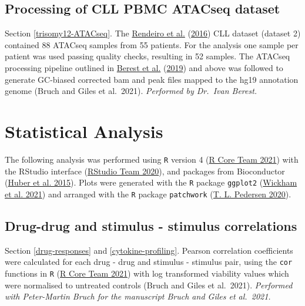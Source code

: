 \documentclass[11pt, a4paper, twosided]{book}
\begin{document}
\hypertarget{processing-of-cll-pbmc-atacseq-dataset}{%
\subsection{Processing of CLL PBMC ATACseq dataset}\label{processing-of-cll-pbmc-atacseq-dataset}}

Section \ref{trisomy12-ATACseq}. The \protect\hyperlink{ref-Rendeiro2016}{Rendeiro et al.} (\protect\hyperlink{ref-Rendeiro2016}{2016}) CLL dataset (dataset 2) contained 88 ATACseq samples from 55 patients. For the analysis one sample per patient was used passing quality checks, resulting in 52 samples. The ATACseq processing pipeline outlined in \protect\hyperlink{ref-Berest2019}{Berest et al.} (\protect\hyperlink{ref-Berest2019}{2019}) and above was followed to generate GC-biased corrected bam and peak files mapped to the hg19 annotation genome (Bruch and Giles et al.~2021). \emph{Performed by Dr.~Ivan Berest.}

\hypertarget{statistical-analysis}{%
\section{Statistical Analysis}\label{statistical-analysis}}

The following analysis was performed using \texttt{R} version 4 (\protect\hyperlink{ref-R-base}{R Core Team 2021}) with the RStudio interface (\protect\hyperlink{ref-RStudio}{RStudio Team 2020}), and packages from Bioconductor (\protect\hyperlink{ref-Bioconductor}{Huber et al. 2015}). Plots were generated with the \texttt{R} package \texttt{ggplot2} (\protect\hyperlink{ref-R-ggplot2}{Wickham et al. 2021}) and arranged with the \texttt{R} package \texttt{patchwork} (\protect\hyperlink{ref-R-patchwork}{T. L. Pedersen 2020}).

\hypertarget{correlations}{%
\subsection{Drug-drug and stimulus - stimulus correlations}\label{correlations}}

Section \ref{drug-responses} and \ref{cytokine-profiling}. Pearson correlation coefficients were calculated for each drug - drug and stimulus - stimulus pair, using the \texttt{cor} functions in \texttt{R} (\protect\hyperlink{ref-R-base}{R Core Team 2021}) with log transformed viability values which were normalised to untreated controls (Bruch and Giles et al.~2021). \emph{Performed with Peter-Martin Bruch for the manuscript Bruch and Giles et al.~2021.}
\end{document}
